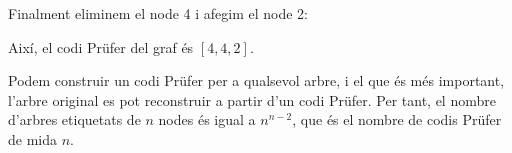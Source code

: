 Finalment eliminem el node 4 i afegim el node 2:
\begin{center}
\end{center}


Així, el codi Prüfer del graf és $[4,4,2]$.

Podem construir un codi Prüfer per a qualsevol arbre, i el que és més
important, l'arbre original es pot reconstruir a partir d'un codi
Prüfer. Per tant, el nombre d'arbres etiquetats de $n$ nodes és igual
a $n^{n-2}$, que és el nombre de codis Prüfer de mida $n$.
